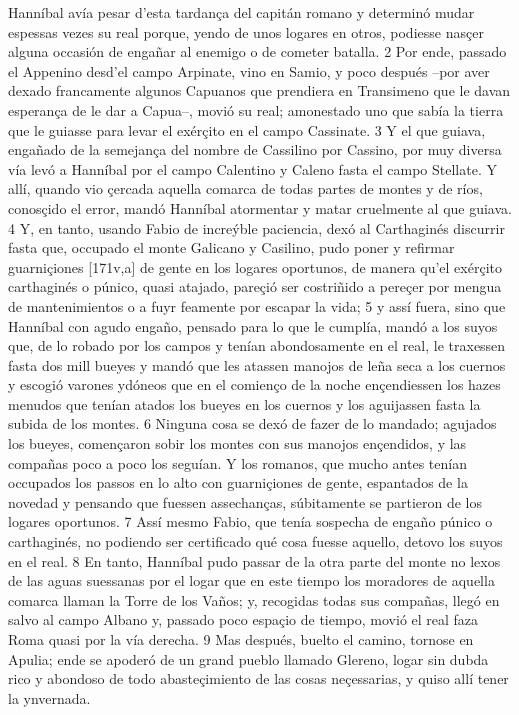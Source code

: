 \documentclass[11pt,twoside]{article}\makeatletter
\def\persName{}\def\name{}
\def\placeName{}
\begin{document}
\pend
{}  {\persName Hanníbal} avía pesar d’esta tardança del capitán romano y determinó mudar espessas vezes su real porque, yendo de unos logares en otros, podiesse nasçer alguna occasión de engañar al enemigo o de cometer batalla. 2 Por ende, passado el Appenino desd’el campo Arpinate, vino en Samio, y poco después –por aver dexado francamente algunos Capuanos que prendiera en Transimeno que le davan esperança de le dar a Capua–, movió su real; amonestado uno que sabía la tierra que le guiasse para levar el exérçito en el campo Cassinate. 3 Y el que guiava, engañado de la semejança del nombre de Cassilino por Cassino, por muy diversa vía levó a  {\persName Hanníbal} por el campo Calentino y Caleno fasta el campo Stellate. Y allí, quando vio çercada aquella comarca de todas partes de montes y de ríos, conosçido el error, mandó  {\persName Hanníbal} atormentar y matar cruelmente al que guiava. 4 Y, en tanto, usando Fabio de increýble paciencia, dexó al Carthaginés discurrir fasta que, occupado el monte Galicano y Casilino, pudo poner y refirmar guarniçiones %
[171v,a] de gente en los logares oportunos, de manera qu’el exérçito carthaginés o púnico, quasi atajado, pareçió ser costriñido a pereçer por mengua de mantenimientos o a fuyr feamente por escapar la vida; 5 y assí fuera, sino que  {\persName Hanníbal} con agudo engaño, pensado para lo que le cumplía, mandó a los suyos que, de lo robado por los campos y tenían abondosamente en el real, le traxessen fasta dos mill bueyes y mandó que les atassen manojos de leña seca a los cuernos y escogió varones ydóneos que en el comienço de la noche ençendiessen los hazes menudos que tenían atados los bueyes en los cuernos y los aguijassen fasta la subida de los montes. 6 Ninguna cosa se dexó de fazer de lo mandado; agujados los bueyes, començaron sobir los montes con sus manojos ençendidos, y las compañas poco a poco los seguían. Y los romanos, que mucho antes tenían occupados los passos en lo alto con guarniçiones de gente, espantados de la novedad y pensando que fuessen assechanças, súbitamente se partieron de los logares oportunos. 7 Assí mesmo Fabio, que tenía sospecha de engaño púnico o carthaginés, no podiendo ser certificado qué cosa fuesse aquello, detovo los suyos en el real. 8 En tanto,  {\persName Hanníbal} pudo passar de la otra parte del monte no lexos de las aguas suessanas por el logar que en este tiempo los moradores de aquella comarca llaman la Torre de los Vaños; y, recogidas todas sus compañas, llegó en salvo al campo Albano y, passado poco espaçio de tiempo, movió el real faza  {\placeName Roma} quasi por la vía derecha. 9 Mas después, buelto el camino, tornose en Apulia; ende se apoderó de un grand pueblo llamado Glereno, logar sin dubda rico y abondoso de todo abasteçimiento de las cosas neçessarias, y quiso allí tener la ynvernada.
\end{document}
